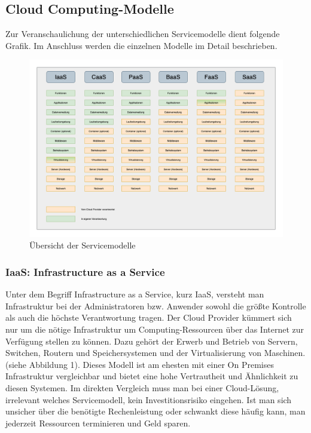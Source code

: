 \clearpage

\subsection{Cloud Computing-Modelle}
\label{Servicemodelle}
Zur Veranschaulichung der unterschiedlichen Servicemodelle dient folgende Grafik.
Im Anschluss werden die einzelnen Modelle im Detail beschrieben.


\begin{figure}[htbp]
    \centering
    \includegraphics[width=1.0\textwidth]{30-Serverless-Theorie/ServiceModelle.png}
    \caption{Übersicht der Servicemodelle}
    \label{fig:meine-grafik}
\end{figure}


   \subsubsection{IaaS: Infrastructure as a Service}
   Unter dem Begriff Infrastructure as a Service, kurz IaaS, versteht man Infrastruktur bei der Administratoren bzw. Anwender sowohl die größte Kontrolle als auch die höchste Verantwortung tragen.
   Der Cloud Provider kümmert sich nur um die nötige Infrastruktur um Computing-Ressourcen über das Internet zur Verfügung stellen zu können.
   Dazu gehört der Erwerb und Betrieb von Servern, Switchen, Routern und Speichersystemen und der Virtualisierung von Maschinen.(siehe Abbildung 1).
   Dieses Modell ist am ehesten mit einer On Premises Infrastruktur vergleichbar und bietet eine hohe Vertrautheit und Ähnlichkeit zu diesen Systemen.
   Im direkten Vergleich muss man bei einer Cloud-Lösung, irrelevant welches Servicemodell, kein Investitionsrisiko eingehen.
   Ist man sich unsicher über die benötigte Rechenleistung oder schwankt diese häufig kann, man jederzeit Ressourcen terminieren und Geld sparen.

